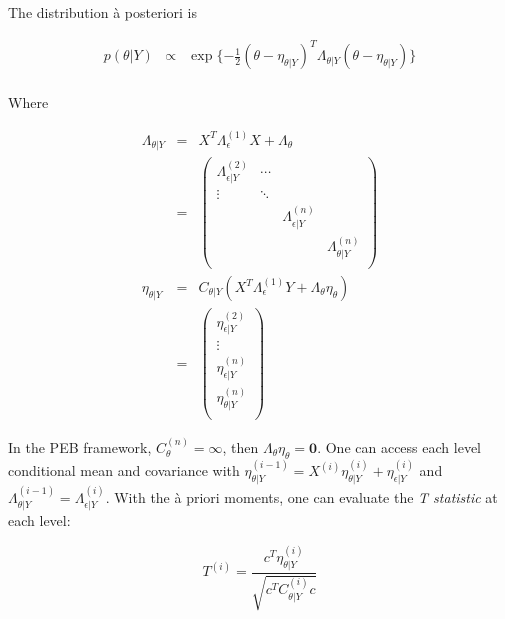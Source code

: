 \documentclass[final, paper=letter,5p,times,twocolumn]{elsarticle}
\theoremstyle{definition}
\begin{document}
The distribution \`a posteriori is

\begin{equation*}
  \left .
  \begin{array}{rcl}
    p(\theta|Y) & \propto & \exp\lbrace -\frac{1}{2} (\theta - \eta_{\theta|Y})^{T} \Lambda_{\theta|Y} (\theta - \eta_{\theta|Y}) \rbrace \\
  \end{array}
  \right .
\end{equation*}

Where

\begin{equation}
  \left .
  \begin{array}{rcl}
    \Lambda_{\theta|Y} & = & X^{T}\Lambda_{\epsilon}^{(1)}X + \Lambda_{\theta}\\
    & = &
    \left (
    \begin{array}{cccc}
      \Lambda_{\epsilon|Y}^{(2)} & \cdots & & \\
      \vdots & \ddots && \\
      && \Lambda_{\epsilon|Y}^{(n)} & \\
      &&& \Lambda_{\theta|Y}^{(n)}  \\
  \end{array} 
    \right ) \\
    \eta_{\theta|Y}  & = & C_{\theta|Y} \left( X^{T}\Lambda_{\epsilon}^{(1)}Y + \Lambda_{\theta}\eta_{\theta} \right)\\
    & = &
    \left (
    \begin{array}{c}
      \eta_{\epsilon|Y}^{(2)} \\
      \vdots \\
      \eta_{\epsilon|Y}^{(n)} \\
      \eta_{\theta|Y}^{(n)} \\
    \end{array}
    \right )
  \end{array}
  \right .
  \label{Moments}
\end{equation}

In the PEB framework, $C_{\theta}^{(n)} = \infty$, then $\Lambda_{\theta}\eta_{\theta} = {\bm 0}$. One can access each level conditional mean and covariance with $\eta_{\theta|Y}^{(i-1)} = X^{(i)}\eta_{\theta|Y}^{(i)} + \eta_{\epsilon|Y}^{(i)}$ and $\Lambda_{\theta|Y}^{(i-1)} = \Lambda_{\epsilon|Y}^{(i)}$. With the \`a priori moments, one can evaluate the {\it T statistic} at each level:

\begin{equation}
  T^{(i)} = \frac{c^{T}\eta_{\theta|Y}^{(i)}}{\sqrt{c^{T}C_{\theta|Y}^{(i)}c}}
  \label{T_stat}
\end{equation}
\end{document}
